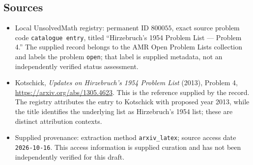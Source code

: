 \documentclass[11pt]{article}
\begin{document}
\subsection{Sources}
\begin{itemize}
\item Local UnsolvedMath registry: permanent ID $800055$, exact source problem code \texttt{catalogue entry}, titled ``Hirzebruch's 1954 Problem List --- Problem 4.'' The supplied record belongs to the AMR Open Problem Lists collection and labels the problem \texttt{open}; that label is supplied metadata, not an independently verified status assessment.
\item Kotschick, \emph{Updates on Hirzebruch's 1954 Problem List} (2013), Problem 4, \url{https://arxiv.org/abs/1305.4623}. This is the reference supplied by the record. The registry attributes the entry to Kotschick with proposed year 2013, while the title identifies the underlying list as Hirzebruch's 1954 list; these are distinct attribution contexts.
\item Supplied provenance: extraction method \texttt{arxiv\_latex}; source access date \texttt{2026-10-16}. This access information is supplied curation and has not been independently verified for this draft.
\end{itemize}
\end{document}
